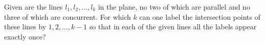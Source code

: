 Given are the lines $l_1,l_2,\ldots ,l_k$ in the plane, no two of which are parallel and no three of which are concurrent. For which $k$ can one label the intersection points of these lines by $1, 2,\ldots , k-1$ so that in each of the given lines all the labels appear exactly once?